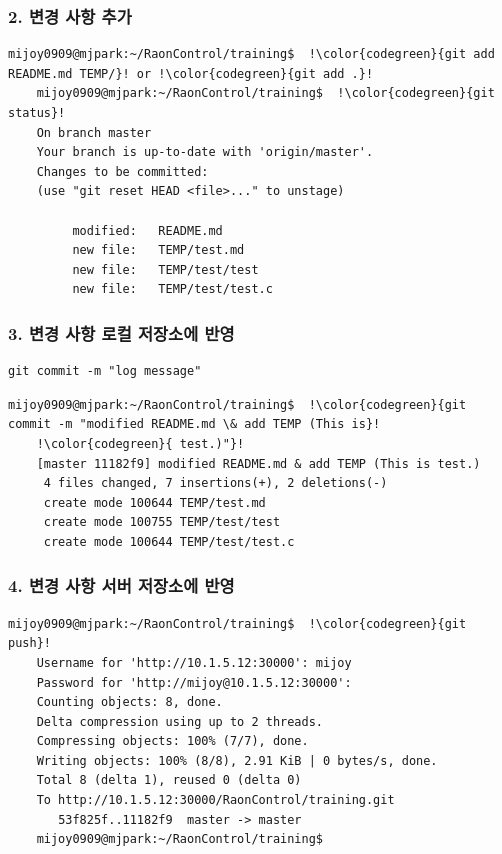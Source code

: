 \documentclass[11pt
  , a4paper
  , article
  , oneside
]{memoir}
\begin{document}
	\subsubsection {2. 변경 사항 추가}
	\begin{lstlisting}[style=termstyle, escapechar=!]	
	mijoy0909@mjpark:~/RaonControl/training$  !\color{codegreen}{git add README.md TEMP/}! or !\color{codegreen}{git add .}!
	mijoy0909@mjpark:~/RaonControl/training$  !\color{codegreen}{git status}!
	On branch master
	Your branch is up-to-date with 'origin/master'.
	Changes to be committed:
	(use "git reset HEAD <file>..." to unstage)

	     modified:   README.md
	     new file:   TEMP/test.md
	     new file:   TEMP/test/test
	     new file:   TEMP/test/test.c \end{lstlisting}
	
	\subsubsection {3. 변경 사항 로컬 저장소에 반영}
	\begin{lstlisting}[style=termstyle, escapechar=!] 
	git commit -m "log message" \end{lstlisting}
	
	\begin{lstlisting}[style=termstyle, escapechar=!]	
	mijoy0909@mjpark:~/RaonControl/training$  !\color{codegreen}{git commit -m "modified README.md \& add TEMP (This is}!
	!\color{codegreen}{ test.)"}!
	[master 11182f9] modified README.md & add TEMP (This is test.)
	 4 files changed, 7 insertions(+), 2 deletions(-)
	 create mode 100644 TEMP/test.md
	 create mode 100755 TEMP/test/test
	 create mode 100644 TEMP/test/test.c \end{lstlisting}

	\subsubsection {4. 변경 사항 서버 저장소에 반영}
	\begin{lstlisting}[style=termstyle, escapechar=!]	
	mijoy0909@mjpark:~/RaonControl/training$  !\color{codegreen}{git push}! 
	Username for 'http://10.1.5.12:30000': mijoy
	Password for 'http://mijoy@10.1.5.12:30000': 
	Counting objects: 8, done.
	Delta compression using up to 2 threads.
	Compressing objects: 100% (7/7), done.
	Writing objects: 100% (8/8), 2.91 KiB | 0 bytes/s, done.
	Total 8 (delta 1), reused 0 (delta 0)
	To http://10.1.5.12:30000/RaonControl/training.git
	   53f825f..11182f9  master -> master
	mijoy0909@mjpark:~/RaonControl/training$ \end{lstlisting}	
	\clearpage
\end{document}
